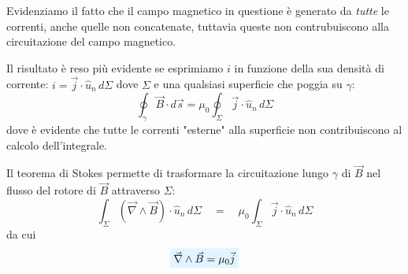 \documentclass[x11names]{report}
\begin{document}
Evidenziamo il fatto che il campo magnetico in questione è generato da \textit{tutte} le correnti, anche quelle non concatenate, tuttavia queste non contrubuiscono alla circuitazione del campo magnetico.

Il risultato è reso più evidente se esprimiamo \(i\) in funzione della sua densità di corrente: \(i = \vec{j}\cdot \hat{u}_n \, d\Sigma\) dove \(\Sigma\) e una qualsiasi superficie che poggia su \(\gamma\):
\[
\oint _\gamma \vec{B}\cdot d\vec{s} = \mu_0 \oint_\Sigma \vec{j}\cdot \hat{u}_n \, d\Sigma
\]
dove è evidente che tutte le correnti "esterne" alla superficie non contribuiscono al calcolo dell'integrale.

Il teorema di Stokes permette di trasformare la circuitazione lungo \(\gamma\) di \(\vec{B}\) nel flusso del rotore di \(\vec{B}\) attraverso \(\Sigma\):
\[
\int_\Sigma (\vec{\nabla}\wedge\vec{B})\cdot \hat{u}_n \, d\Sigma \quad = \quad \mu_0 \int_\Sigma \vec{j}\cdot \hat{u}_n \, d\Sigma
\]
da cui
\begin{equation}\label{ampere}
	\viola{\vec{\nabla}\wedge\vec{B} = \mu_0 \vec{j}}
\end{equation}
\end{document}
